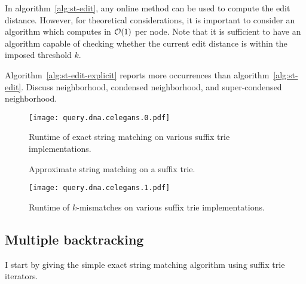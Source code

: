 In algorithm~\ref{alg:st-edit}, any online method can be used to compute the edit distance.
However, for theoretical considerations, it is important to consider an algorithm which computes in $\mathcal{O}(1)$ per node.
Note that it is sufficient to have an algorithm capable of checking whether the current edit distance is within the imposed threshold $k$.

Algorithm~\ref{alg:st-edit-explicit} reports more occurrences than algorithm~\ref{alg:st-edit}.
Discuss neighborhood, condensed neighborhood, and super-condensed neighborhood.


\begin{figure}[h]
\begin{center}
\caption[Exact string matching runtime]{Runtime of exact string matching on various suffix trie implementations.}
\label{fig:query-dna-exact}
\texttt{[image: query.dna.celegans.0.pdf]}
\end{center}
\end{figure}

\begin{figure}[h]
\begin{center}
\caption{Approximate string matching on a suffix trie.}
\label{fig:st-hamming}

\end{center}
\end{figure}

\begin{figure}[h]
\begin{center}
\caption[$k$-mismatches runtime]{Runtime of $k$-mismatches on various suffix trie implementations.}
\label{fig:query-dna-apx}
\texttt{[image: query.dna.celegans.1.pdf]}
\end{center}
\end{figure}


\subsection{Multiple backtracking}

I start by giving the simple exact string matching algorithm using suffix trie iterators.

